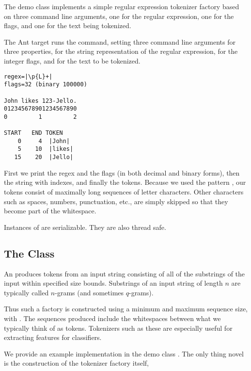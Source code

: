 The demo class  implements a simple regular expression
tokenizer factory based on three command line arguments, one for the
regular expression, one for the flags, and one for the text being tokenized.
%
%

The Ant target  runs the command, setting three
command line arguments for three properties,  for the
string representation of the regular expression,  for the
integer flags, and  for the text to be tokenized.
%
\begin{verbatim}
regex=|\p{L}+|
flags=32 (binary 100000)

John likes 123-Jello.
012345678901234567890
0         1         2

START   END TOKEN
    0     4  |John|
    5    10  |likes|
   15    20  |Jello|
\end{verbatim}
%
First we print the regex and the flags (in both decimal and binary
forms), then the string with indexes, and finally the tokens.  Because
we used the pattern , our tokens consist of
maximally long sequences of letter characters.  Other characters such
as spaces, numbers, punctuation, etc., are simply skipped so that they
become part of the whitespace.

Instances of  are serializable.  They are
also thread safe.


\subsection{The  Class}

An  produces tokens from an input string
consisting of all of the substrings of the input within specified size
bounds.  Substrings of an input string of length $n$ are typically
called $n$-grams (and sometimes $q$-grams).

Thus such a factory is constructed using a minimum and
maximum sequence size, with .
The sequences produced include the whitespaces between what we
typically think of as tokens.  Tokenizers such as these are especially
useful for extracting features for classifiers.

We provide an example implementation in the demo class
.  The only thing novel is the construction of
the tokenizer factory itself,
%
%


